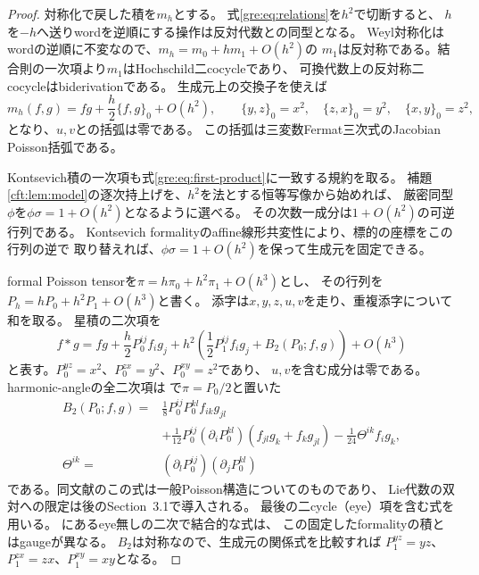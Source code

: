 \begin{proof}
対称化で戻した積を$m_h$とする。
式\eqref{gre:eq:relations}を$h^2$で切断すると、
$h$を$-h$へ送りwordを逆順にする操作は反対代数との同型となる。
Weyl対称化はwordの逆順に不変なので、$m_h=m_0+hm_1+O(h^2)$の
$m_1$は反対称である。結合則の一次項より$m_1$はHochschild二cocycleであり、
可換代数上の反対称二cocycleはbiderivationである。
生成元上の交換子を使えば
\begin{equation}\label{gre:eq:first-product}
 m_h(f,g)=fg+\frac h2\{f,g\}_0+O(h^2),\qquad
 \{y,z\}_0=x^2,\quad\{z,x\}_0=y^2,\quad\{x,y\}_0=z^2,
\end{equation}
となり、$u,v$との括弧は零である。
この括弧は三変数Fermat三次式のJacobian Poisson括弧である。

Kontsevich積の一次項も式\eqref{gre:eq:first-product}に一致する規約を取る。
補題\ref{cft:lem:model}の逐次持上げを、$h^2$を法とする恒等写像から始めれば、
厳密同型$\phi$を$\phi\sigma=1+O(h^2)$となるように選べる。
その次数一成分は$1+O(h^2)$の可逆行列である。
Kontsevich formalityのaffine線形共変性により、標的の座標をこの行列の逆で
取り替えれば、$\phi\sigma=1+O(h^2)$を保って生成元を固定できる。

formal Poisson tensorを$\pi=h\pi_0+h^2\pi_1+O(h^3)$とし、
その行列を$P_h=hP_0+h^2P_1+O(h^3)$と書く。
添字は$x,y,z,u,v$を走り、重複添字について和を取る。
星積の二次項を
\[
 f*g=fg+\frac h2P_0^{ij}f_i g_j
 +h^2\left(\frac12P_1^{ij}f_i g_j+B_2(P_0;f,g)\right)+O(h^3)
\]
と表す。$P_0^{yz}=x^2$、$P_0^{zx}=y^2$、$P_0^{xy}=z^2$であり、
$u,v$を含む成分は零である。
harmonic-angleの全二次項は
\cite[Section~2, equation~(3)]{GRDito}で$\pi=P_0/2$と置いた
\begin{equation}\label{gre:eq:full-second-product}
 \begin{aligned}
 B_2(P_0;f,g)
 ={}&\frac18P_0^{ij}P_0^{kl}f_{ik}g_{jl}\\
 &+\frac1{12}P_0^{ij}(\partial_iP_0^{kl})
       (f_{jl}g_k+f_k g_{jl})
 -\frac1{24}\Theta^{ik}f_i g_k,\\
 \Theta^{ik}={}&(\partial_lP_0^{ij})(\partial_jP_0^{kl})
 \end{aligned}
\end{equation}
である。同文献のこの式は一般Poisson構造についてのものであり、
Lie代数の双対への限定は後のSection~3.1で導入される。
最後の二cycle（eye）項を含む式を用いる。
\cite[Section~1.4.2]{PKontsevich}にあるeye無しの二次で結合的な式は、
この固定したformalityの積とはgaugeが異なる。
$B_2$は対称なので、生成元の関係式を比較すれば
$P_1^{yz}=yz$、$P_1^{zx}=zx$、$P_1^{xy}=xy$となる。


\end{proof}
